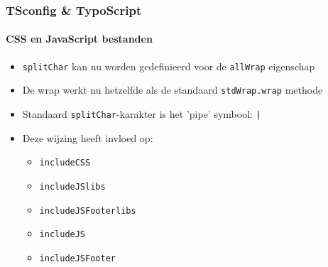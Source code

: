 \begin{frame}[fragile]
	\frametitle{TSconfig \& TypoScript}
	\framesubtitle{CSS en JavaScript bestanden}

	\begin{itemize}
		\item \texttt{splitChar} kan nu worden gedefinieerd voor de \texttt{allWrap} eigenschap 
		\item De wrap werkt nu hetzelfde als de standaard \texttt{stdWrap.wrap} methode 
		\item Standaard \texttt{splitChar}-karakter is het 'pipe' symbool: \texttt{|}
		\item Deze wijzing heeft invloed op:

			\begin{itemize}
				\item \texttt{includeCSS}
				\item \texttt{includeJSlibs}
				\item \texttt{includeJSFooterlibs}
				\item \texttt{includeJS}
				\item \texttt{includeJSFooter}
			\end{itemize}

	\end{itemize}

\end{frame}


